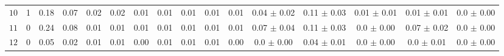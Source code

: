 \begin{tabular}{l|cc|cccccccc|ccccc}
 $10$  & 1 & 0.18 & 0.07 & 0.02 & 0.02 & 0.01 & 0.01 & 0.01 & 0.01 & 0.01 & 0.04 $\pm$ 0.02 & 0.11 $\pm$ 0.03 & 0.01 $\pm$ 0.01 & 0.01 $\pm$ 0.01 & 0.0 $\pm$ 0.00 \\ 
 $11$  & 0 & 0.24 & 0.08 & 0.01 & 0.01 & 0.01 & 0.01 & 0.01 & 0.01 & 0.01 & 0.07 $\pm$ 0.04 & 0.11 $\pm$ 0.03 & 0.0 $\pm$ 0.00 & 0.07 $\pm$ 0.02 & 0.0 $\pm$ 0.00 \\ 
 $12$  & 0 & 0.05 & 0.02 & 0.01 & 0.01 & 0.00 & 0.01 & 0.01 & 0.01 & 0.00 & 0.0 $\pm$ 0.00 & 0.04 $\pm$ 0.01 & 0.0 $\pm$ 0.00 & 0.0 $\pm$ 0.01 & 0.0 $\pm$ 0.00 \\ 
\end{tabular} 
